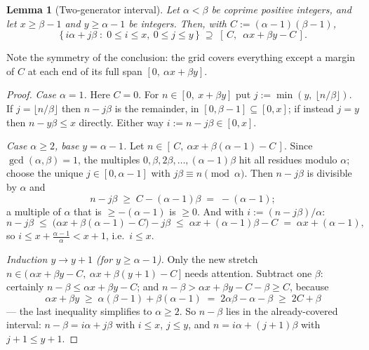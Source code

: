 \documentclass[11pt,reqno]{amsart}
\theoremstyle{plain}
\newtheorem{lemma}[theorem]{Lemma}
\theoremstyle{definition}
\theoremstyle{remark}
\begin{document}
\begin{lemma}[Two-generator interval]\label{lem:twogen-friendly}
Let $\alpha < \beta$ be coprime positive integers, and let $x \ge \beta - 1$ and
$y \ge \alpha - 1$ be integers. Then, with $C := (\alpha - 1)(\beta - 1)$,
\[
  \{\, i\alpha + j\beta \;:\; 0 \le i \le x,\ 0 \le j \le y \,\}
  \;\supseteq\; [\,C,\ \; \alpha x + \beta y - C\,] .
\]
\end{lemma}

Note the symmetry of the conclusion: the grid covers everything except a margin of
$C$ at each end of its full span $[0,\ \alpha x + \beta y]$.

\begin{proof}
\emph{Case $\alpha = 1$.} Here $C = 0$. For $n \in [0,\ x + \beta y]$ put $j :=
\min(y,\ \lfloor n/\beta \rfloor)$. If $j = \lfloor n/\beta \rfloor$ then $n -
j\beta$ is the remainder, in $[0, \beta - 1] \subseteq [0, x]$; if instead $j = y$
then $n - y\beta \le x$ directly. Either way $i := n - j\beta \in [0, x]$.

\emph{Case $\alpha \ge 2$, base $y = \alpha - 1$.} Let $n \in [\,C,\ \alpha x +
\beta(\alpha-1) - C\,]$. Since $\gcd(\alpha, \beta) = 1$, the multiples $0, \beta,
2\beta, \dots, (\alpha-1)\beta$ hit all residues modulo $\alpha$; choose the unique
$j \in [0, \alpha - 1]$ with $j\beta \equiv n \pmod \alpha$. Then $n - j\beta$ is
divisible by $\alpha$ and
\[
  n - j\beta \;\ge\; C - (\alpha - 1)\beta \;=\; -(\alpha - 1) ;
\]
a multiple of $\alpha$ that is $\ge -(\alpha-1)$ is $\ge 0$. And with $i := (n -
j\beta)/\alpha$:
\[
  n - j\beta \;\le\; \big(\alpha x + \beta(\alpha - 1) - C\big) - j\beta
  \;\le\; \alpha x + (\alpha - 1)\beta - C
  \;=\; \alpha x + (\alpha - 1) ,
\]
so $i \le x + \tfrac{\alpha - 1}{\alpha} < x + 1$, i.e.\ $i \le x$.

\emph{Induction $y \to y + 1$ (for $y \ge \alpha - 1$).} Only the new stretch $n
\in (\,\alpha x + \beta y - C,\ \alpha x + \beta(y+1) - C\,]$ needs attention.
Subtract one $\beta$: certainly $n - \beta \le \alpha x + \beta y - C$; and $n -
\beta > \alpha x + \beta y - C - \beta \ge C$, because
\[
  \alpha x + \beta y \;\ge\; \alpha(\beta - 1) + \beta(\alpha - 1)
  \;=\; 2\alpha\beta - \alpha - \beta
  \;\ge\; 2C + \beta
\]
--- the last inequality simplifies to $\alpha \ge 2$. So $n - \beta$ lies in the
already-covered interval: $n - \beta = i\alpha + j\beta$ with $i \le x$, $j \le y$,
and $n = i\alpha + (j+1)\beta$ with $j + 1 \le y + 1$.
\end{proof}
\end{document}
